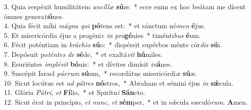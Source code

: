 3. Quia respéxit humilitátem \textit{ancíllæ} \textbf{sú}æ: * ecce enim ex hoc beátam me dícent ómnes genera\textit{ti}\textbf{ó}nes.\\
4. Quia fécit míhi \textit{mágna qui} \textbf{pó}tens est: * et sánctum nó\textit{men} \textbf{é}jus.\\
5. Et misericórdia éjus a progéni\textit{e in pro}\textbf{gé}nies * timénti\textit{bus} \textbf{é}um.\\
6. Fécit poténtiam in \textit{bráchio} \textbf{sú}o: * dispérsit supérbos ménte cór\textit{dis} \textbf{sú}i.\\
7. Depósuit po\textit{téntes de} \textbf{sé}de, * et exaltá\textit{vit} \textbf{hú}miles.\\
8. Esuriéntes \textit{implévit} \textbf{bó}nis: * et dívites dimísit \textit{in}\textbf{á}nes.\\
9. Suscépit Israel \textit{púerum} \textbf{sú}um, * recordátus misericórdi\textit{æ} \textbf{sú}æ.\\
10. Sicut locútus est \textit{ad pátres} \textbf{nó}stros, * Abraham et sémini éjus \textit{in} \textbf{sǽ}cula.\\
11. Glória \textit{Pátri, et} \textbf{Fí}lio, * et Spirítu\textit{i} \textbf{Sán}cto.\\
12. Sicut érat in princípio, \textit{et nunc, et} \textbf{sém}per, * et in sǽcula sæculó\textit{rum.} \textbf{A}men.